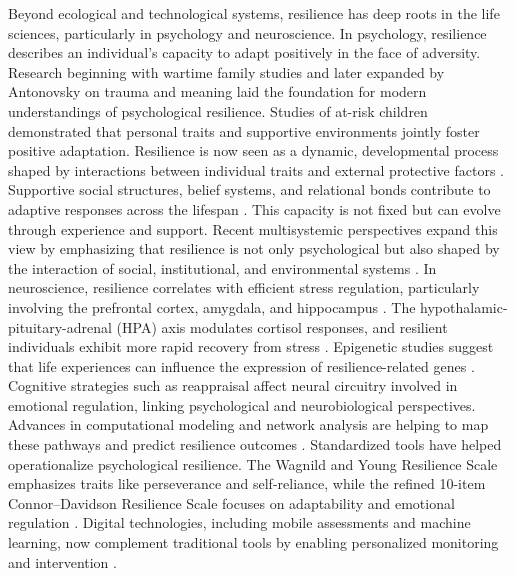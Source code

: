 Beyond ecological and technological systems, resilience has deep roots in the life sciences, particularly in psychology and neuroscience. In psychology, resilience describes an individual’s capacity to adapt positively in the face of adversity. Research beginning with wartime family studies \autocite{hill1949families} and later expanded by Antonovsky on trauma and meaning \autocite{antonovsky1971twentyfive} laid the foundation for modern understandings of psychological resilience. Studies of at-risk children \autocite{werner1995resilience} demonstrated that personal traits and supportive environments jointly foster positive adaptation. Resilience is now seen as a dynamic, developmental process shaped by interactions between individual traits and external protective factors \autocite{rutter1987psychosocial, ungar2021modeling}. Supportive social structures, belief systems, and relational bonds contribute to adaptive responses across the lifespan \autocite{walsh1996concept, masten2010disasters}. This capacity is not fixed but can evolve through experience and support. Recent multisystemic perspectives expand this view by emphasizing that resilience is not only psychological but also shaped by the interaction of social, institutional, and environmental systems \autocite{ungar2021modeling}. In neuroscience, resilience correlates with efficient stress regulation, particularly involving the prefrontal cortex, amygdala, and hippocampus \autocite{kalisch2024neurobiology}. The hypothalamic-pituitary-adrenal (HPA) axis modulates cortisol responses, and resilient individuals exhibit more rapid recovery from stress \autocite{mcewen2004protection}. Epigenetic studies suggest that life experiences can influence the expression of resilience-related genes \autocite{rakesh2019resilience}. Cognitive strategies such as reappraisal affect neural circuitry involved in emotional regulation, linking psychological and neurobiological perspectives. Advances in computational modeling and network analysis are helping to map these pathways and predict resilience outcomes \autocite{manikis2019computational}. Standardized tools have helped operationalize psychological resilience. The Wagnild and Young Resilience Scale emphasizes traits like perseverance and self-reliance, while the refined 10-item Connor–Davidson Resilience Scale focuses on adaptability and emotional regulation \autocite{wagnild1993development, campbell2007psychometric}. Digital technologies, including mobile assessments and machine learning, now complement traditional tools by enabling personalized monitoring and intervention \autocite{kleitman2022applying}.\\
